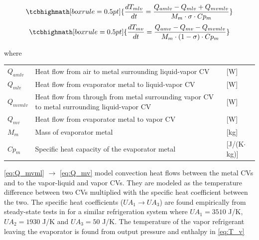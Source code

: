 \begin{equation}
	\tcbhighmath[boxrule = 0.5pt]{ 	\frac{dT_{mlv}}{dt}  = \frac{Q_{amlv}-Q_{mlv} + Q_{mvmlv}}{M_m \cdot \sigma \cdot Cp_m}  }    \label{eq:evap_dT_ml}
\end{equation}
\begin{equation}
	\tcbhighmath[boxrule = 0.5pt]{ \frac{dT_{mv}}{dt} = \frac{Q_{amv} - Q_{mv} - Q_{mvmlv}}{M_m \cdot (1 - \sigma) \cdot Cp_m } }     \label{eq:evap_dT_mv}
\end{equation}


where

\begin{center}
	\begin{tabular}{l p{10cm} l}
		$Q_{amlv}$  & Heat flow from air to metal surrounding liquid-vapor CV                                     & [\si{W}]                          \\
		$Q_{mlv}$   & Heat flow from evaporator metal to liquid-vapor CV                                          & [\si{W}]                          \\
		$Q_{mvmlv}$ & Heat flow from through from metal surrounding vapor CV to metal surrounding liquid-vapor CV & [\si{W}]                          \\
		$Q_{mv}$    & Heat flow from evaporator metal to vapor CV                                                 & [\si{W}]                          \\
		$M_{m} $    & Mass of evaporator metal                                                                    & [\si{kg}]                         \\
		$Cp_{m}$    & Specific heat capacity of the evaporator metal                                              & [\si{J}/(\si{K}$ \cdot $\si{kg})]
	\end{tabular}
\end{center}

\medskip
\cref{eq:Q_mvml} $\rightarrow$ \cref{eq:Q_mv} model convection heat flows between the metal CVs and to the vapor-liquid and vapor CVs. They are modeled as the temperature difference between two CVs multiplied with the specific heat coefficient between the two. The specific heat coefficients ($U A_1 \rightarrow U A_3$) are found empirically from steady-state tests in \cite{Sorensen2013} for a similar refrigeration system where $U A_1 = 3510$ \si{J}/\si{K}, $U A_2 = 1930$ \si{J}/\si{K} and $U A_3 = 50$ \si{J}/\si{K}. The temperature of the vapor refrigerant leaving the evaporator is found from output pressure and enthalpy in \cref{eq:T_v}

